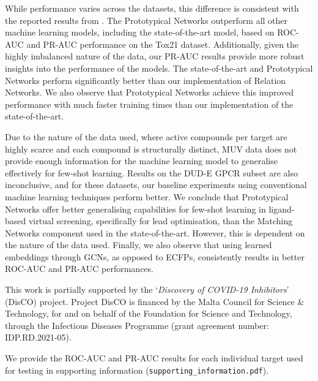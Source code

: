 \documentclass[journal=jcisd8,manuscript=article]{achemso} %
\begin{document}
While performance varies across the datasets, this difference is consistent with the reported results from \citet{altae2017low}. The Prototypical Networks outperform all other machine learning models, including the state-of-the-art model, based on ROC-AUC and PR-AUC performance on the Tox21 dataset. Additionally, given the highly imbalanced nature of the data, our PR-AUC results provide more robust insights into the performance of the models. The state-of-the-art and Prototypical Networks perform significantly better than our implementation of Relation Networks. We also observe that Prototypical Networks achieve this improved performance with much faster training times than our implementation of the state-of-the-art. 

Due to the nature of the data used, where active compounds per target are highly scarce and each compound is structurally distinct, MUV data does not provide enough information for the machine learning model to generalise effectively for few-shot learning. Results on the DUD-E GPCR subset are also inconclusive, and for these datasets, our baseline experiments using conventional machine learning techniques perform better. We conclude that Prototypical Networks offer better generalising capabilities for few-shot learning in ligand-based virtual screening, specifically for lead optimisation, than the Matching Networks component used in the state-of-the-art. However, this is dependent on the nature of the data used. Finally, we also observe that using learned embeddings through GCNs, as opposed to ECFPs, consistently results in better ROC-AUC and PR-AUC performances.


\begin{acknowledgement}

This work is partially supported by the `\textit{Discovery of COVID-19 Inhibitors}' (DisCO) project. Project DisCO is financed by the Malta Council for Science \& Technology, for and on behalf of the Foundation for Science and Technology, through the Infectious Diseases Programme (grant agreement number: IDP.RD.2021-05).

\end{acknowledgement}

\begin{suppinfo}

We provide the ROC-AUC and PR-AUC results for each individual target used for testing in supporting information (\texttt{supporting\_information.pdf}).

\end{suppinfo}
\end{document}
